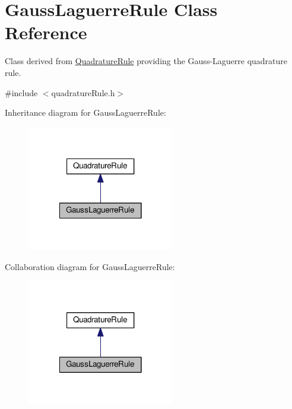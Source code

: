 \hypertarget{classGaussLaguerreRule}{\section{Gauss\-Laguerre\-Rule Class Reference}
\label{classGaussLaguerreRule}
}


Class derived from \hyperlink{classQuadratureRule}{Quadrature\-Rule} providing the Gauss-\/\-Laguerre quadrature rule.  




{\ttfamily \#include $<$quadrature\-Rule.\-h$>$}



Inheritance diagram for Gauss\-Laguerre\-Rule\-:\nopagebreak
\begin{figure}[H]
\begin{center}
\leavevmode
\includegraphics[width=182pt]{classGaussLaguerreRule__inherit__graph}
\end{center}
\end{figure}


Collaboration diagram for Gauss\-Laguerre\-Rule\-:\nopagebreak
\begin{figure}[H]
\begin{center}
\leavevmode
\includegraphics[width=182pt]{classGaussLaguerreRule__coll__graph}
\end{center}
\end{figure}
